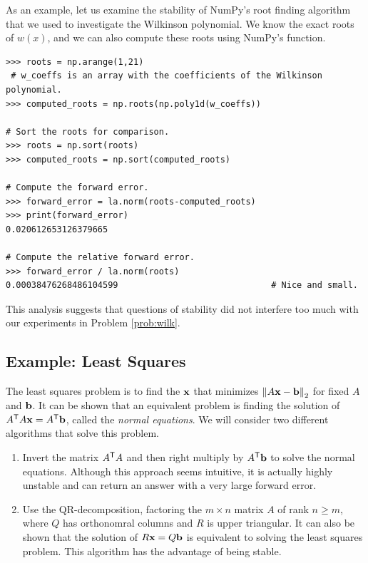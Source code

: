 As an example, let us examine the stability of NumPy's root finding algorithm that we used to investigate the Wilkinson polynomial.
We know the exact roots of $w(x)$, and we can also compute these roots using NumPy's  function.

\begin{lstlisting}
>>> roots = np.arange(1,21)
 # w_coeffs is an array with the coefficients of the Wilkinson polynomial.
>>> computed_roots = np.roots(np.poly1d(w_coeffs))

# Sort the roots for comparison.
>>> roots = np.sort(roots)
>>> computed_roots = np.sort(computed_roots)

# Compute the forward error.
>>> forward_error = la.norm(roots-computed_roots)
>>> print(forward_error)
0.020612653126379665

# Compute the relative forward error.
>>> forward_error / la.norm(roots)
0.00038476268486104599                              # Nice and small.
\end{lstlisting}

This analysis suggests that questions of stability did not interfere too much with our experiments in Problem \ref{prob:wilk}.

\subsection*{Example: Least Squares} %

The least squares problem is to find the $\mathbf{x}$ that minimizes $\left\lVert A\mathbf{x} -\mathbf{b}\right\rVert_2$ for fixed $A$ and $\mathbf{b}$.
It can be shown that an equivalent problem is finding the solution of $A^{\mathsf T} A\mathbf{x} =A^{\mathsf T} \mathbf{b}$, called the \emph{normal equations}.
We will consider two different algorithms that solve this problem.

\begin{enumerate}
\item Invert the matrix $A^{\mathsf T} A$ and then right multiply by $A^{\mathsf T} \mathbf{b}$ to solve the normal equations.
Although this approach seems intuitive, it is actually highly unstable and can return an answer with a very large forward error.

\item
Use the QR-decomposition, factoring the $m\times n$ matrix $A$ of rank $n\geq m$, where $Q$ has orthonomral columns and $R$ is upper triangular.
It can also be shown that the solution of $R \mathbf{x} = Q\mathbf{b}$ is equivalent to solving the least squares problem.
This algorithm has the advantage of being stable.
\end{enumerate}

